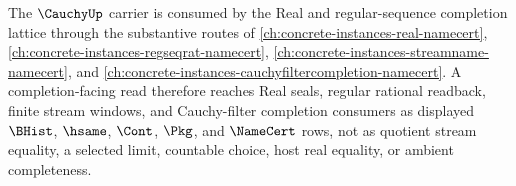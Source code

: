 The $\CauchyUp$ carrier is consumed by the Real and regular-sequence completion lattice through the substantive routes of \autoref{ch:concrete-instances-real-namecert}, \autoref{ch:concrete-instances-regseqrat-namecert}, \autoref{ch:concrete-instances-streamname-namecert}, and \autoref{ch:concrete-instances-cauchyfiltercompletion-namecert}. A completion-facing read therefore reaches Real seals, regular rational readback, finite stream windows, and Cauchy-filter completion consumers as displayed $\BHist$, $\hsame$, $\Cont$, $\Pkg$, and $\NameCert$ rows, not as quotient stream equality, a selected limit, countable choice, host real equality, or ambient completeness.
